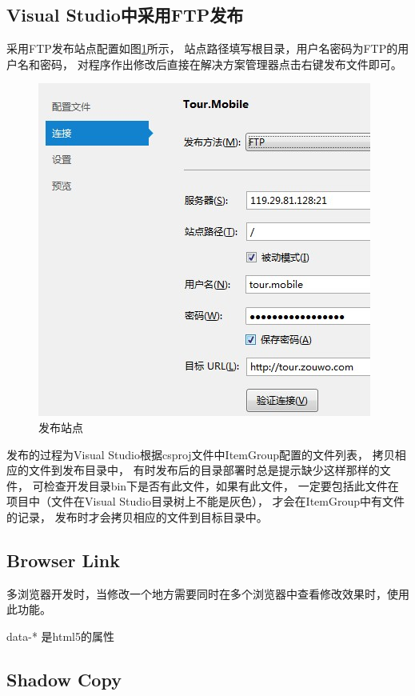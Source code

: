 \documentclass{book}
\begin{document}
\subsection{Visual Studio中采用FTP发布}

采用FTP发布站点配置如图\ref{fig:PublishWebSiteByFTP}所示，
站点路径填写根目录，用户名密码为FTP的用户名和密码，
对程序作出修改后直接在解决方案管理器点击右键发布文件即可。

\begin{figure}[htbp]
	\centering
	\includegraphics[scale=0.8]{PublishWebSiteByFTP.jpg}
	\caption{发布站点}
	\label{fig:PublishWebSiteByFTP}
\end{figure}

发布的过程为Visual Studio根据csproj文件中ItemGroup配置的文件列表，
拷贝相应的文件到发布目录中，
有时发布后的目录部署时总是提示缺少这样那样的文件，
可检查开发目录bin下是否有此文件，如果有此文件，
一定要包括此文件在项目中（文件在Visual Studio目录树上不能是灰色），
才会在ItemGroup中有文件的记录，
发布时才会拷贝相应的文件到目标目录中。

\subsection{Browser Link}

多浏览器开发时，当修改一个地方需要同时在多个浏览器中查看修改效果时，使用此功能。

data-*  是html5的属性

\subsection{Shadow Copy}
\end{document}
